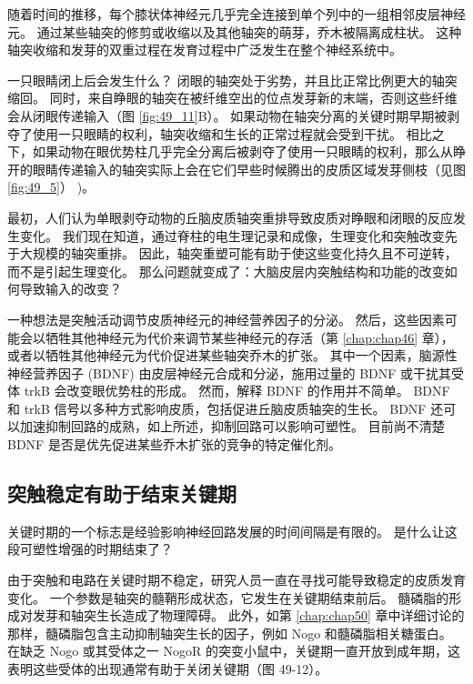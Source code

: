 随着时间的推移，每个膝状体神经元几乎完全连接到单个列中的一组相邻皮层神经元。
通过某些轴突的修剪或收缩以及其他轴突的萌芽，乔木被隔离成柱状。
这种轴突收缩和发芽的双重过程在发育过程中广泛发生在整个神经系统中。


一只眼睛闭上后会发生什么？
闭眼的轴突处于劣势，并且比正常比例更大的轴突缩回。
同时，来自睁眼的轴突在被纤维空出的位点发芽新的末端，否则这些纤维会从闭眼传递输入（图 \ref{fig:49_11}B）。
如果动物在轴突分离的关键时期早期被剥夺了使用一只眼睛的权利，轴突收缩和生长的正常过程就会受到干扰。
相比之下，如果动物在眼优势柱几乎完全分离后被剥夺了使用一只眼睛的权利，那么从睁开的眼睛传递输入的轴突实际上会在它们早些时候腾出的皮质区域发芽侧枝（见图 \ref{fig:49_5}） )。


最初，人们认为单眼剥夺动物的丘脑皮质轴突重排导致皮质对睁眼和闭眼的反应发生变化。
我们现在知道，通过脊柱的电生理记录和成像，生理变化和突触改变先于大规模的轴突重排。
因此，轴突重塑可能有助于使这些变化持久且不可逆转，而不是引起生理变化。
那么问题就变成了：大脑皮层内突触结构和功能的改变如何导致输入的改变？


一种想法是突触活动调节皮质神经元的神经营养因子的分泌。
然后，这些因素可能会以牺牲其他神经元为代价来调节某些神经元的存活（第 \ref{chap:chap46} 章），或者以牺牲其他神经元为代价促进某些轴突乔木的扩张。
其中一个因素，脑源性神经营养因子 (BDNF) 由皮层神经元合成和分泌，施用过量的 BDNF 或干扰其受体 trkB 会改变眼优势柱的形成。
然而，解释 BDNF 的作用并不简单。
BDNF 和 trkB 信号以多种方式影响皮质，包括促进丘脑皮质轴突的生长。
BDNF 还可以加速抑制回路的成熟，如上所述，抑制回路可以影响可塑性。
目前尚不清楚 BDNF 是否是优先促进某些乔木扩张的竞争的特定催化剂。



\subsection{突触稳定有助于结束关键期}

关键时期的一个标志是经验影响神经回路发展的时间间隔是有限的。 是什么让这段可塑性增强的时期结束了？

由于突触和电路在关键时期不稳定，研究人员一直在寻找可能导致稳定的皮质发育变化。 一个参数是轴突的髓鞘形成状态，它发生在关键期结束前后。 髓磷脂的形成对发芽和轴突生长造成了物理障碍。 此外，如第 \ref{chap:chap50} 章中详细讨论的那样，髓磷脂包含主动抑制轴突生长的因子，例如 Nogo 和髓磷脂相关糖蛋白。 
在缺乏 Nogo 或其受体之一 NogoR 的突变小鼠中，关键期一直开放到成年期，这表明这些受体的出现通常有助于关闭关键期（图 49-12）。

